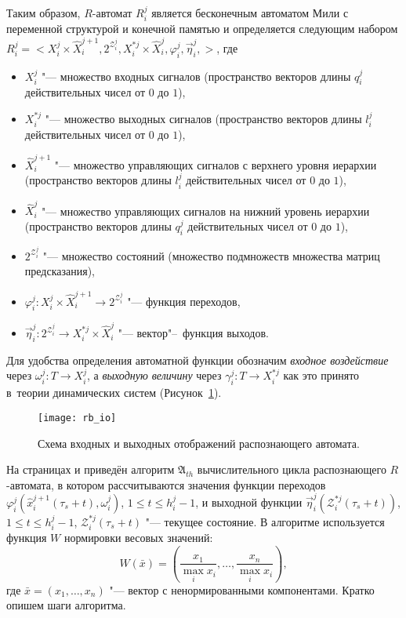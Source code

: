 Таким образом, $R$-автомат $R_i^j$ является бесконечным автоматом Мили с переменной структурой и конечной памятью и определяется следующим набором $R_i^j=<X_i^j\times \hat{X}_i^{j+1}, 2^{\mathcal Z_i^j}, X_i^{*j}\times \hat{X}_i^j,\varphi_i^j,\vec\eta_i^j,>$, где
\begin{itemize}
	\item $X_i^j$ "--- множество входных сигналов (пространство векторов длины $q_i^j$ действительных чисел от $0$ до $1$), 
	\item $X_i^{*j}$ "--- множество выходных сигналов (пространство векторов длины $l_i^j$ действительных чисел от $0$ до $1$), 
	\item $\hat{X}_i^{j+1}$ "--- множество управляющих сигналов с верхнего уровня иерархии (пространство векторов длины $l_i^j$ действительных чисел от $0$ до $1$),
	\item $\hat{X}_i^j$ "--- множество управляющих сигналов на нижний уровень иерархии (пространство векторов длины $q_i^j$ действительных чисел от $0$ до $1$),
	\item $2^{\mathcal Z_i^j}$ "--- множество состояний (множество подмножеств множества матриц предсказания),
	\item $\varphi_i^j:X_i^j\times \hat{X}_i^{j+1}\to 2^{\mathcal Z_i^j}$ "--- функция переходов,
	\item $\vec\eta_i^j:2^{\mathcal Z_i^j} \to X_i^{*j}\times \hat{X}_i^j$ "--- вектор"--~функция выходов.
\end{itemize}

Для удобства определения автоматной функции обозначим \textit{входное воздействие} через $\omega_i^j:T{\to}X_i^j$, а \textit{выходную величину} через $\gamma_i^j:T{\to}X_i^{*j}$ как это принято в~теории динамических систем \cite{Kalman1971} (Рисунок~\ref{fig:rb_io}).

\begin{figure}[h]
	\centering
	\texttt{[image: rb\_io]}
	\caption{Схема входных и выходных отображений распознающего автомата.}
	\label{fig:rb_io}
\end{figure}

На страницах \pageref{alg:th_init} и \pageref{alg:th_cycle} приведён алгоритм $\mathfrak{A}_{th}$ вычислительного цикла распознающего $R$-автомата, в котором рассчитываются значения функции переходов $\varphi_i^j(\hat{x}_i^{j+1}(\tau_s+t),\omega_i^j)$, $1\leqslant{t}\leqslant h_i^j-1$, и выходной функции $\vec\eta_i^j(\mathcal Z_i^{*j}(\tau_s+t))$, $1\leqslant{t}\leqslant h_i^j-1$, $\mathcal Z_i^{*j}(\tau_s+t)$ "--- текущее состояние. В алгоритме используется функция $W$ нормировки весовых значений:
\begin{equation}
	W(\bar x)=\left(\frac{x_1}{\max\limits_i x_i},\dots,\frac{x_n}{\max\limits_i x_i}\right),
\end{equation} 
где $\bar x=(x_1,\dots,x_n)$ "--- вектор с ненормированными компонентами. Кратко опишем шаги алгоритма.

